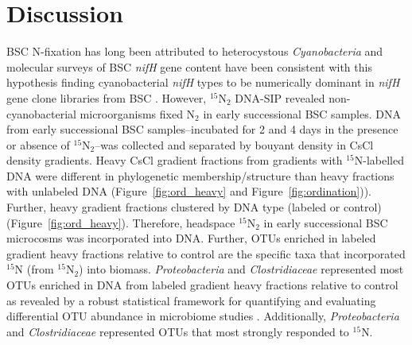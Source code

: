 \section{Discussion}
BSC N-fixation has long been attributed to heterocystous
\textit{Cyanobacteria} and molecular surveys of BSC \textit{nifH} gene content
have been consistent with this hypothesis finding cyanobacterial \textit{nifH}
types to be numerically dominant in \textit{nifH} gene clone libraries from BSC
\citep{Yeager,14766579,Yeager_2012}. However, $^{15}$N$_{2}$ DNA-SIP revealed
non-cyanobacterial microorganisms fixed N$_{2}$ in early successional BSC samples.
DNA from early successional BSC samples--incubated for 2 and 4
days in the presence or absence of $^{15}$N$_{2}$--was collected
and separated by bouyant density in CsCl density gradients.
Heavy CsCl gradient fractions from gradients with $^{15}$N-labelled DNA were
different in phylogenetic membership/structure than heavy fractions with
unlabeled DNA (Figure~\ref{fig:ord_heavy} and Figure~\ref{fig:ordination})).
Further, heavy gradient fractions clustered by DNA type (labeled or control)
(Figure~\ref{fig:ord_heavy}). Therefore, headspace $^{15}$N$_{2}$ in
early successional BSC microcosms was incorporated into DNA. Further, OTUs
enriched in labeled gradient heavy fractions relative to control are the
specific taxa that incorporated $^{15}$N (from $^{15}$N$_{2}$) into biomass.
\textit{Proteobacteria} and \textit{Clostridiaceae} represented most OTUs
enriched in DNA from labeled gradient heavy fractions relative to control as
revealed by a robust statistical framework for quantifying and evaluating
differential OTU abundance in microbiome studies \citep{24699258, Love_2014}.
Additionally, \textit{Proteobacteria} and \textit{Clostridiaceae} represented
OTUs that most strongly responded to $^{15}$N.

